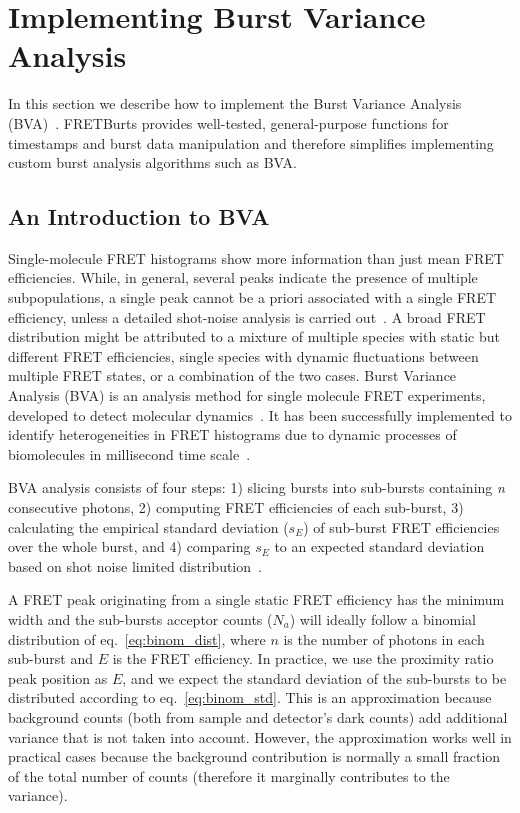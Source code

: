 \section{Implementing Burst Variance Analysis}
In this section we describe how to implement the Burst Variance Analysis (BVA)~\cite{Torella_2011}.
FRETBurts provides well-tested, general-purpose functions for timestamps and burst data 
manipulation and therefore simplifies implementing custom burst analysis algorithms such as BVA.

\subsection{An Introduction to BVA}
Single-molecule FRET histograms show more information than just mean FRET efficiencies. 
While, in general, several peaks indicate the presence of multiple subpopulations, 
a single peak cannot be a priori associated with a single FRET efficiency,
unless a detailed shot-noise analysis is carried out~\cite{Nir_2006,Antonik2006}.
A broad FRET distribution might be attributed to a mixture of multiple species with static but different FRET efficiencies, single species with dynamic fluctuations between multiple FRET states, or a combination of the two cases. Burst Variance Analysis (BVA) is an analysis method for single molecule FRET experiments, developed to detect molecular dynamics~\cite{Torella_2011}. It has been successfully implemented to identify heterogeneities in FRET histograms due to dynamic processes of biomolecules in millisecond time scale~\cite{Torella_2011, Robb_2013}.

BVA analysis consists of four steps: 1) slicing bursts into sub-bursts containing \textit{n} consecutive photons, 2) computing FRET efficiencies of each sub-burst, 3) calculating the empirical standard deviation ($s_E$) of sub-burst FRET efficiencies over the whole burst, and 4) comparing $s_E$ to an expected standard deviation based on shot noise limited distribution~\cite{Torella_2011}. 

A FRET peak originating from a single static FRET efficiency has the minimum width and 
the sub-bursts acceptor counts ($N_a$) will ideally follow a binomial distribution of 
eq.~\ref{eq:binom_dist}, where $n$ is the number of photons in each sub-burst and 
$E$ is the FRET efficiency. In practice, we use the proximity ratio peak position as $E$,
and we expect the standard deviation of the sub-bursts to be distributed according to 
eq.~\ref{eq:binom_std}. This is an approximation because background counts (both from
sample and detector's dark counts) add additional variance that is not taken into account.
However, the approximation works well in practical cases because the background contribution
is normally a small fraction of the total number of counts (therefore it marginally contributes to the variance).

